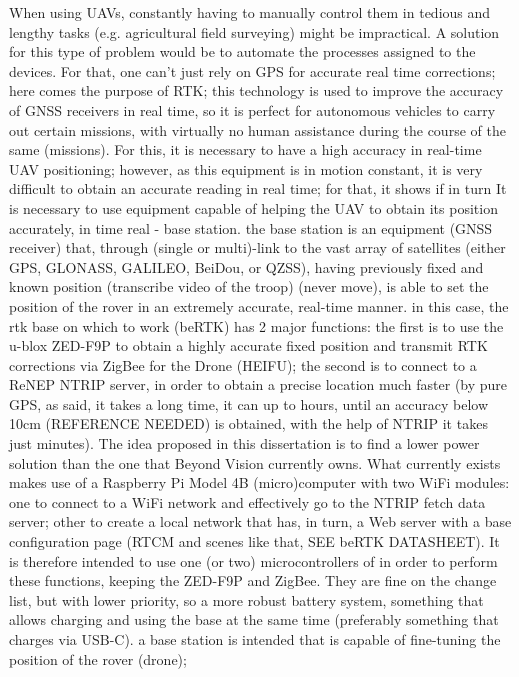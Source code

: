 When using UAVs, constantly having to manually control them in tedious and lengthy tasks (e.g. agricultural field surveying) might be impractical.
A solution for this type of problem would be to automate the processes assigned to the devices. For that, one can't just rely on GPS for accurate real time corrections; here comes the purpose of RTK; %
this technology is used to improve the accuracy of GNSS receivers in real time, so it is perfect for autonomous vehicles to carry out certain missions, with virtually no human assistance during the course of the same (missions). For this, it is necessary to have a high accuracy in real-time UAV positioning;
however, as this equipment is in motion constant, it is very difficult to obtain an accurate reading in real time;
for that, it shows if in turn It is necessary to use equipment capable of helping the UAV to obtain its position accurately, in time real - base station. the base station is an equipment (GNSS receiver) that, through (single or multi)-link to the vast array of satellites (either GPS, GLONASS, GALILEO, BeiDou, or QZSS),
having previously fixed and known position (transcribe video of the troop) (never move), is able to set the position of the rover in an extremely accurate, real-time manner.
in this case, the rtk base on which to work (beRTK) has 2 major functions: the first is to use the u-blox ZED-F9P to obtain a highly accurate fixed position and transmit RTK corrections via ZigBee for the Drone (HEIFU);
the second is to connect to a ReNEP NTRIP server, in order to obtain a precise location much faster (by pure GPS, as said, it takes a long time, it can up to hours, until an accuracy below 10cm (REFERENCE NEEDED) is obtained, with the help of NTRIP it takes just minutes).
The idea proposed in this dissertation is to find a lower power solution than the one that Beyond Vision currently owns. What currently exists makes use of a Raspberry Pi Model 4B (micro)computer with two WiFi modules:
one to connect to a WiFi network and effectively go to the NTRIP fetch data server;
other to create a local network that has, in turn, a Web server with a base configuration page (RTCM and scenes like that, SEE beRTK DATASHEET). It is therefore intended to use one (or two) microcontrollers of in order to perform these functions, keeping the ZED-F9P and ZigBee.
They are fine on the change list, but with lower priority, so a more robust battery system, something that allows charging and using the base at the same time (preferably something that charges via USB-C).
a base station is intended that is capable of fine-tuning the position of the rover (drone);

